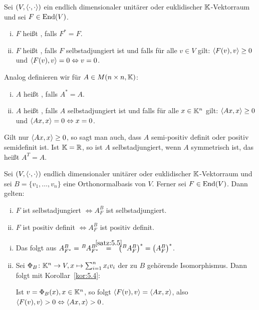 \begin{definition}
	\label{def:5.8}
	Sei $(V,\left\langle\cdot,\cdot\right\rangle)$ ein endlich dimensionaler unitärer oder euklidischer $\mathbb{K}$-Vektorraum und sei $F \in \operatorname{End}(V)$.
	\begin{enumerate}[(i)]
		\item $F$ heißt , falls $F^* = F$.
		\item $F$ heißt , falls $F$ selbstadjungiert ist und falls für alle $v \in V$ gilt: $\left\langle F(v),v\right\rangle \geq 0$ und $\left\langle F(v),v\right\rangle = 0 \Leftrightarrow v = 0$.
	\end{enumerate}
	
	Analog definieren wir für $A \in M(n \times n, \mathbb{K})$:
	\begin{enumerate}[(i)]
		\item $A$ heißt , falls $A^* = A$.
		\item $A$ heißt , falls $A$ selbstadjungiert ist und falls für alle $x \in \mathbb{K}^n$ gilt: $\left\langle Ax,x\right\rangle \geq 0$ und $\left\langle Ax,x\right\rangle = 0 \Leftrightarrow x = 0$.
	\end{enumerate}
	
	Gilt nur $\left\langle Ax,x\right\rangle \geq 0$, so sagt man auch, dass $A$ semi-positiv definit oder positiv semidefinit ist.
	Ist $\mathbb{K}= \mathbb{R}$, so ist $A$ selbstadjungiert, wenn $A$ symmetrisch ist, das heißt $A^T = A$.
\end{definition}

\begin{lemma}
	\label{lemma:5.9}
	Sei $(V,\left\langle\cdot,\cdot\right\rangle)$ endlich dimensionaler unitärer oder euklidischer $\mathbb{K}$-Vektorraum und sei $B = \{v_1,\dots,v_n\}$ eine Orthonormalbasis von $V$.
	Ferner sei $F \in \operatorname{End}(V)$.
	Dann gelten:
	\begin{enumerate}[(i)]
		\item $F$ ist selbstadjungiert $\Leftrightarrow A^B_F$ ist selbstadjungiert.
		\item $F$ ist positiv definit $\Leftrightarrow A^B_F$ ist positiv definit.
	\end{enumerate}
\end{lemma}

\begin{beweis}
	\begin{enumerate}[(i)]
		\item Das folgt aus $A^B_{F^*} = \mat{A}{B}{B}{F^*} \stack{\ref{satz:5.5}}{=} \enb{\mat{A}{B}{B}{F}}^* = \enb{A^B_F}^*$.
		\item Sei $\Phi_B\colon \mathbb{K}^n \rightarrow V, x \mapsto \sum_{i=1}^{n} x_i v_i$ der zu $B$ gehörende Isomorphismus.
		Dann folgt mit Korollar~\ref{kor:5.4}:
		
		Ist $v = \Phi_B(x), x \in \mathbb{K}^n$, so folgt $\left\langle F(v),v\right\rangle = \left\langle Ax,x\right\rangle$, also $\left\langle F(v),v\right\rangle > 0 \Leftrightarrow \left\langle Ax,x\right\rangle > 0$. 
	\end{enumerate}
\end{beweis}

